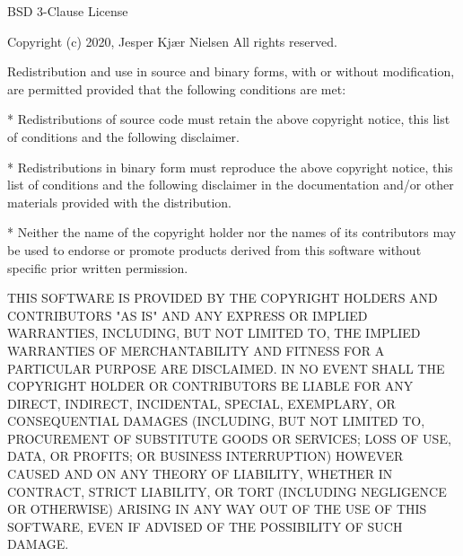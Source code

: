 BSD 3-Clause License

Copyright (c) 2020, Jesper Kjær Nielsen
All rights reserved.

Redistribution and use in source and binary forms, with or without
modification, are permitted provided that the following conditions are met:

* Redistributions of source code must retain the above copyright notice, this
  list of conditions and the following disclaimer.

* Redistributions in binary form must reproduce the above copyright notice,
  this list of conditions and the following disclaimer in the documentation
  and/or other materials provided with the distribution.

* Neither the name of the copyright holder nor the names of its
  contributors may be used to endorse or promote products derived from
  this software without specific prior written permission.

THIS SOFTWARE IS PROVIDED BY THE COPYRIGHT HOLDERS AND CONTRIBUTORS "AS IS"
AND ANY EXPRESS OR IMPLIED WARRANTIES, INCLUDING, BUT NOT LIMITED TO, THE
IMPLIED WARRANTIES OF MERCHANTABILITY AND FITNESS FOR A PARTICULAR PURPOSE ARE
DISCLAIMED. IN NO EVENT SHALL THE COPYRIGHT HOLDER OR CONTRIBUTORS BE LIABLE
FOR ANY DIRECT, INDIRECT, INCIDENTAL, SPECIAL, EXEMPLARY, OR CONSEQUENTIAL
DAMAGES (INCLUDING, BUT NOT LIMITED TO, PROCUREMENT OF SUBSTITUTE GOODS OR
SERVICES; LOSS OF USE, DATA, OR PROFITS; OR BUSINESS INTERRUPTION) HOWEVER
CAUSED AND ON ANY THEORY OF LIABILITY, WHETHER IN CONTRACT, STRICT LIABILITY,
OR TORT (INCLUDING NEGLIGENCE OR OTHERWISE) ARISING IN ANY WAY OUT OF THE USE
OF THIS SOFTWARE, EVEN IF ADVISED OF THE POSSIBILITY OF SUCH DAMAGE.